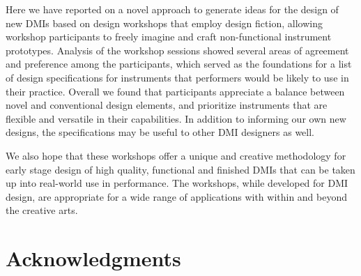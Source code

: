 \documentclass[letterpaper, 12pt]{article}
\begin{document}
Here we have reported on a novel approach to generate ideas for the design of new DMIs based on design workshops that employ design fiction, allowing workshop participants to freely imagine and craft non-functional instrument prototypes.
Analysis of the workshop sessions showed several areas of agreement and preference among the participants, which served as the foundations for a list of design specifications for instruments that performers would be likely to use in their practice. Overall we found that participants appreciate a balance between novel and conventional design elements, and prioritize instruments that are flexible and versatile in their capabilities. In addition to informing our own new designs, the specifications may be useful to other DMI designers as well. 


We also hope that these workshops offer a unique and creative methodology for early stage design of high quality, functional and finished DMIs that can be taken up into real-world use in performance. The workshops, while developed for DMI design, are appropriate for a wide range of applications with within and beyond the creative arts. 

\section{Acknowledgments}
\end{document}
